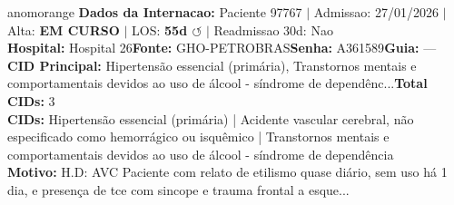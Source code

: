 \documentclass[a4paper,10pt]{article}
\begin{document}
\begin{anomalycard}[Internacao 163465 | GHO-PETROBRAS | ALTO (z=4.28)]{anomorange}
\textbf{Dados da Internacao:} Paciente 97767 $\mid$ Admissao: 27/01/2026 $\mid$ Alta: \textcolor{anomorange}{\textbf{EM CURSO}} $\mid$ LOS: \textbf{55d \textcolor{anomorange}{$\circlearrowleft$}} $\mid$ Readmissao 30d: Nao\\
\textbf{Hospital:} Hospital 26\quad\textbf{Fonte:} GHO-PETROBRAS\quad\textbf{Senha:} A361589\quad\textbf{Guia:} ---\\
\textbf{CID Principal:} {\small Hipertensão essencial (primária), Transtornos mentais e comportamentais devidos ao uso de álcool - síndrome de dependênc...}\quad\textbf{Total CIDs:} 3\\

\textbf{CIDs:} {\scriptsize Hipertensão essencial (primária) | Acidente vascular cerebral, não especificado como hemorrágico ou isquêmico | Transtornos mentais e comportamentais devidos ao uso de álcool - síndrome de dependência}\\

\textbf{Motivo:} {\scriptsize H.D: AVC  Paciente com relato de etilismo quase diário, sem uso há 1 dia, e presença de tce com sincope e trauma frontal a esque...}\\


\end{anomalycard}
\end{document}
